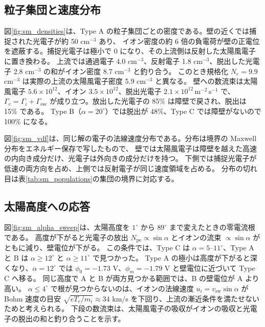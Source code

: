 \subsection{粒子集団と速度分布}
図\ref{fig:sm_densities}は、Type A の粒子集団ごとの密度である。壁の近くでは捕捉された光電子が約 50 cm$^{-3}$ あり、
イオン密度の約 6 倍の負電荷が壁の正電位を遮蔽する。捕捉光電子は極小で 0 になり、その上流側は反射した太陽風電子に置き換わる。
上流では通過電子 4.0 cm$^{-3}$、反射電子 1.8 cm$^{-3}$、脱出した光電子 2.8 cm$^{-3}$ の和がイオン密度 8.7 cm$^{-3}$ と釣り合う。
このとき規格化 $N_e=9.9$ cm$^{-3}$ は実際の上流の太陽風電子密度 5.9 cm$^{-3}$ と異なる。
壁への数流束は太陽風電子 $5.6\times10^{12}$、イオン $3.5\times10^{12}$、脱出光電子 $2.1\times10^{12}\,\mathrm{m^{-2}\,s^{-1}}$ で、
$\Gamma_e=\Gamma_i+\Gamma_{\mathrm{esc}}$ が成り立つ。放出した光電子の 85\% は障壁で戻され、脱出は 15\% である。
Type B（$\alpha=20^\circ$）では脱出が 48\%、Type C では障壁がないので 100\% になる。



図\ref{fig:sm_vdf}は、同じ解の電子の法線速度分布である。分布は境界の Maxwell 分布をエネルギー保存で写したもので、
壁では太陽風電子は障壁を越えた高速の内向き成分だけ、光電子は外向きの成分だけを持つ。
下側では捕捉光電子が低速の両方向を占め、上側では反射電子が同じ速度領域を占める。
分布の切れ目は表\ref{tab:sm_populations}の集団の境界に対応する。



\subsection{太陽高度への応答}
図\ref{fig:sm_alpha_sweep}は、太陽高度を $1^\circ$ から $89^\circ$ まで変えたときの零電流根である。
高度が下がると光電子の放出 $N_{\mathrm{pe}}\propto\sin\alpha$ とイオンの流束 $\propto\sin\alpha$ がともに減り、壁電位が下がる。
この条件では、Type C は $\alpha=5$--$11^\circ$、Type A と B は $\alpha\ge12^\circ$ と $\alpha\ge11^\circ$ で見つかった。
Type A の極小は高度が下がると深くなり、$\alpha=12^\circ$ では $\phi_0=-1.73$ V、$\phi_m=-1.79$ V と壁電位に近づいて Type C へ移る。
同じ高度で A と B が両方見つかる範囲では、B の壁電位が A より高い。
$\alpha\le4^\circ$ で根が見つからないのは、イオンの法線速度 $u_i=v_{\mathrm{sw}}\sin\alpha$ が Bohm 速度の目安
$\sqrt{eT_e/m_i}\approx34$ km/s を下回り、上流の漸近条件を満たせないためと考えられる。
下段の数流束は、太陽風電子の吸収がイオンの吸収と光電子の脱出の和と釣り合うことを示す。

